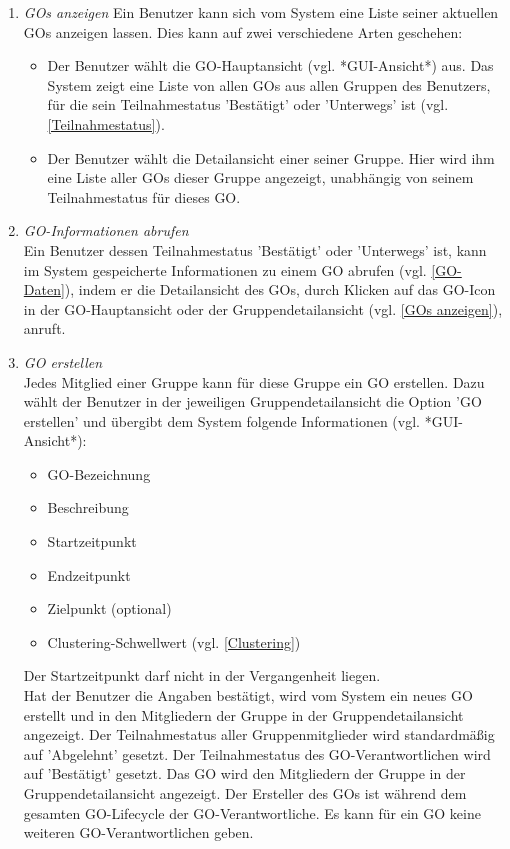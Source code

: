 \documentclass[parskip=full]{scrartcl}
\def\threedigits#1{%
  \ifnum#1<100 0\fi
  \ifnum#1<10 0\fi
  \number#1}
\begin{document}
\begin{enumerate}[label={\textbf{/F\protect\threedigits{\theenumi}0/}}, leftmargin=*, resume]	

	\item \textit{GOs anzeigen}\label{GOs anzeigen} Ein Benutzer kann sich vom System eine Liste seiner aktuellen GOs anzeigen lassen. Dies kann auf zwei verschiedene Arten geschehen:
	\begin{itemize}
		\item Der Benutzer wählt die GO-Hauptansicht (vgl. *GUI-Ansicht*) aus. Das System zeigt eine Liste von allen GOs aus allen Gruppen des Benutzers, für die sein Teilnahmestatus 'Bestätigt' oder 'Unterwegs' ist (vgl. \ref{Teilnahmestatus}).
		\item Der Benutzer wählt die Detailansicht einer seiner Gruppe. Hier wird ihm eine Liste aller GOs dieser Gruppe angezeigt, unabhängig von seinem Teilnahmestatus für dieses GO.
	\end{itemize}
	
	\item \textit{GO-Informationen abrufen}\label{GO-Informationen abrufen} \\
	Ein Benutzer dessen Teilnahmestatus 'Bestätigt' oder 'Unterwegs' ist, kann im System gespeicherte Informationen zu einem GO abrufen (vgl. \ref{GO-Daten}), indem er die Detailansicht des GOs, durch Klicken auf das GO-Icon in der GO-Hauptansicht oder der Gruppendetailansicht (vgl. \ref{GOs anzeigen}), anruft.

	\item \textit{GO erstellen}\label{GO erstellen} \\
	Jedes Mitglied einer Gruppe kann für diese Gruppe ein GO erstellen. Dazu wählt der Benutzer in der jeweiligen Gruppendetailansicht die Option 'GO erstellen' und übergibt dem System folgende Informationen (vgl. *GUI-Ansicht*):
	\begin{itemize}
		\item GO-Bezeichnung
		\item Beschreibung
		\item Startzeitpunkt
		\item Endzeitpunkt 
		\item Zielpunkt (optional)
		\item \colorbox{shadecolor}{Clustering-Schwellwert (vgl. \ref{Clustering})}
	\end{itemize}
Der Startzeitpunkt darf nicht in der Vergangenheit liegen.\\
Hat der Benutzer die Angaben bestätigt, wird vom System ein neues GO erstellt und in den Mitgliedern der Gruppe in der Gruppendetailansicht angezeigt. Der Teilnahmestatus aller Gruppenmitglieder wird standardmäßig auf 'Abgelehnt' gesetzt. Der Teilnahmestatus des GO-Verantwortlichen wird auf 'Bestätigt' gesetzt.
Das GO wird den Mitgliedern der Gruppe in der Gruppendetailansicht angezeigt.
Der Ersteller des GOs ist während dem gesamten GO-Lifecycle der GO-Verantwortliche. Es kann für ein GO keine weiteren GO-Verantwortlichen geben.
	

\end{enumerate}
\end{document}
